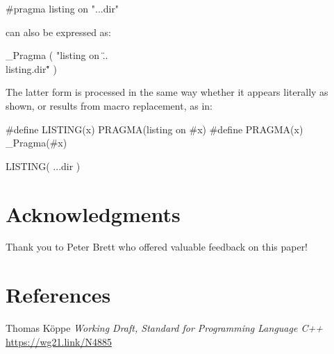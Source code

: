\documentclass{wg21}
\begin{document}
\pnum
\begin{example}
\begin{codeblock}
    #pragma listing on "..\listing.dir"
\end{codeblock}
can also be expressed as:
\begin{codeblock}
    _Pragma ( "listing on \"..\\listing.dir\"" )
\end{codeblock}
The latter form is processed in the same way whether it appears literally
as shown, or results from macro replacement, as in:
\begin{codeblock}
    #define LISTING(x) PRAGMA(listing on #x)
    #define PRAGMA(x) _Pragma(#x)

    LISTING( ..\listing.dir )
\end{codeblock}
\end{example}


\section{Acknowledgments}

Thank you to Peter Brett who offered valuable feedback on this paper!


\section{References}





\renewcommand{\section}[2]{}%
\begin{thebibliography}{9}

Thomas Köppe
\emph{Working Draft, Standard for Programming Language C++}\newline
\url{https://wg21.link/N4885}

\end{thebibliography}
\end{document}
